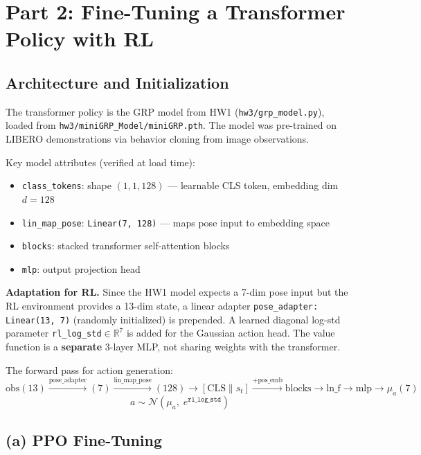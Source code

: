 \documentclass[11pt,letterpaper]{article}
\begin{document}
\section{Part 2: Fine-Tuning a Transformer Policy with RL}

\subsection{Architecture and Initialization}

The transformer policy is the GRP model from HW1 (\texttt{hw3/grp\_model.py}), loaded from \texttt{hw3/miniGRP\_Model/miniGRP.pth}. The model was pre-trained on LIBERO demonstrations via behavior cloning from image observations.

Key model attributes (verified at load time):
\begin{itemize}
  \item \texttt{class\_tokens}: shape $(1,1,128)$ — learnable CLS token, embedding dim $d=128$
  \item \texttt{lin\_map\_pose}: \texttt{Linear(7, 128)} — maps pose input to embedding space
  \item \texttt{blocks}: stacked transformer self-attention blocks
  \item \texttt{mlp}: output projection head
\end{itemize}

\textbf{Adaptation for RL.} Since the HW1 model expects a 7-dim pose input but the RL environment provides a 13-dim state, a linear adapter \texttt{pose\_adapter: Linear(13, 7)} (randomly initialized) is prepended. A learned diagonal log-std parameter \texttt{rl\_log\_std}$\in\mathbb{R}^7$ is added for the Gaussian action head. The value function is a \textbf{separate} 3-layer MLP, not sharing weights with the transformer.

The forward pass for action generation:
\[
  \text{obs}(13) \xrightarrow{\text{pose\_adapter}} (7) \xrightarrow{\text{lin\_map\_pose}} (128) \to [\text{CLS} \| s_t] \xrightarrow{+\text{pos\_emb}} \text{blocks} \to \text{ln\_f} \to \text{mlp} \to \mu_a(7)
\]
\[
  a \sim \mathcal{N}(\mu_a,\; e^{\texttt{rl\_log\_std}})
\]

\subsection{(a) PPO Fine-Tuning}
\end{document}
